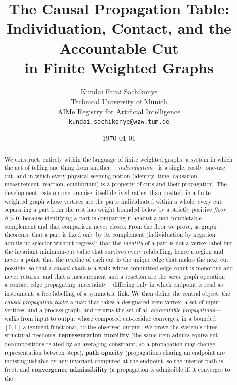 \documentclass[11pt,a4paper]{article}
\title{\textbf{The Causal Propagation Table:\\[3pt]
Individuation, Contact, and the Accountable Cut\\
in Finite Weighted Graphs}}
\author{%
Kundai Farai Sachikonye\\
\small Technical University of Munich\\
\small AIMe Registry for Artificial Intelligence\\
\small \texttt{kundai.sachikonye@wzw.tum.de}}
\date{\today}
\theoremstyle{thmstyle}
\theoremstyle{definition}
\theoremstyle{remark}
\newcommand{\flo}{\beta}                 %
\begin{document}
\maketitle

\begin{abstract}
\noindent
We construct, entirely within the language of finite weighted graphs, a
system in which the act of telling one thing from another---%
\emph{individuation}---is a single, costly, one-use cut, and in which
every physical-seeming notion (identity, time, causation, measurement,
reaction, equilibrium) is a property of cuts and their propagation. The
development rests on one premise, itself derived rather than posited: in a
finite weighted graph whose vertices are the parts individuated within a
whole, every cut separating a part from the rest has weight bounded below
by a strictly positive \emph{floor} $\flo>0$, because identifying a part
is comparing it against a non-completable complement and that comparison
never closes. From the floor we prove, as graph theorems: that a part is
fixed only by its complement (individuation by negation admits no
selector without regress); that the \emph{identity} of a part is not a
vertex label but the invariant minimum-cut value that survives every
relabelling, hence a region and never a point; that the residue of each
cut is the unique edge that makes the next cut possible, so that a
\emph{causal chain} is a walk whose committed-edge count is monotone and
never returns; and that a measurement and a reaction are the \emph{same}
graph operation---a contact edge propagating uncertainty---differing only
in which endpoint is read as instrument, a free labelling of a symmetric
link. We then define the central object, the \emph{causal propagation
table}: a map that takes a designated item vertex, a set of input
vertices, and a process graph, and returns the set of all
\emph{accountable propagations}---walks from input to output whose
composed cut-residue converges, in a bounded $[0,1]$ alignment functional,
to the observed output. We prove the system's three structural freedoms:
\textbf{representation mobility} (the same item admits equivalent
decompositions related by an averaging constraint, so a propagation may
change representation between steps), \textbf{path opacity} (propagations
sharing an endpoint are indistinguishable by any invariant computed at the
endpoint, so the interior path is free), and \textbf{convergence
admissibility} (a propagation is admissible iff it converges to the

\end{abstract}
\end{document}
